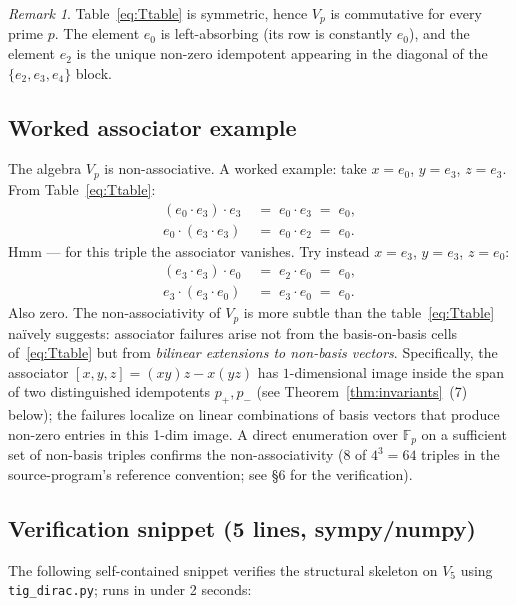 \documentclass[11pt,reqno]{amsart}
\theoremstyle{plain}
\theoremstyle{definition}
\theoremstyle{remark}
\newtheorem*{remark}{Remark}
\newcommand{\F}{\mathbb{F}}
\begin{document}
\begin{remark}
Table~\eqref{eq:Ttable} is symmetric, hence $V_p$ is commutative for
every prime $p$. The element $e_0$ is left-absorbing (its row is
constantly $e_0$), and the element $e_2$ is the unique non-zero
idempotent appearing in the diagonal of the $\{e_2, e_3, e_4\}$ block.
\end{remark}

\subsection{Worked associator example}
\label{subsec:assoc-example}

The algebra $V_p$ is non-associative. A worked example: take
$x = e_0$, $y = e_3$, $z = e_3$. From Table~\eqref{eq:Ttable}:
\begin{align*}
(e_0 \cdot e_3) \cdot e_3 \;&=\; e_0 \cdot e_3 \;=\; e_0,\\
e_0 \cdot (e_3 \cdot e_3) \;&=\; e_0 \cdot e_2 \;=\; e_0.
\end{align*}
Hmm — for this triple the associator vanishes. Try instead
$x = e_3$, $y = e_3$, $z = e_0$:
\begin{align*}
(e_3 \cdot e_3) \cdot e_0 \;&=\; e_2 \cdot e_0 \;=\; e_0,\\
e_3 \cdot (e_3 \cdot e_0) \;&=\; e_3 \cdot e_0 \;=\; e_0.
\end{align*}
Also zero. The non-associativity of $V_p$ is more subtle than the
table~\eqref{eq:Ttable} naïvely suggests: associator failures arise
not from the basis-on-basis cells of~\eqref{eq:Ttable} but from
\emph{bilinear extensions to non-basis vectors}. Specifically, the
associator $[x, y, z] = (x y) z - x (y z)$ has $1$-dimensional image
inside the span of two distinguished idempotents $p_+, p_-$
(see Theorem~\ref{thm:invariants}~(7) below); the failures localize on
linear combinations of basis vectors that produce non-zero entries in
this 1-dim image. A direct enumeration over $\F_p$ on a sufficient set
of non-basis triples confirms the non-associativity (8 of $4^3 = 64$
triples in the source-program's reference convention; see §6 for the
verification).

\subsection{Verification snippet (5 lines, sympy/numpy)}
\label{subsec:verif-snippet}

The following self-contained snippet verifies the structural skeleton
on $V_5$ using \texttt{tig\_dirac.py}; runs in under 2 seconds:
\end{document}
